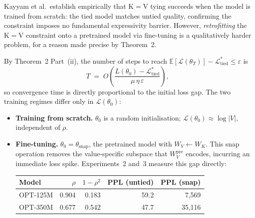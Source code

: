 

\begin{remark}
\label{rem:ft-vs-scratch}
Kayyam et al.\ establish empirically that K$=$V tying succeeds when
the model is trained from scratch: the tied model matches untied
quality, confirming the constraint imposes no fundamental
expressivity barrier.
However, \emph{retrofitting} the K$=$V constraint onto a pretrained
model via fine-tuning is a qualitatively harder problem, for a
reason made precise by Theorem~2.

By Theorem~2 Part~(ii), the number of steps to reach
$\mathbb{E}[\mathcal{L}(\theta_T)] - \mathcal{L}^*_{\mathrm{tied}} \leq \varepsilon$
is
\begin{equation}
  T \;=\; O\!\left(
    \frac{L(\theta_0) - \mathcal{L}^*_{\mathrm{tied}}}{\mu\,\eta\,\varepsilon}
  \right),
  \label{eq:T-bound}
\end{equation}
so convergence time is directly proportional to the initial loss gap.
The two training regimes differ only in $\mathcal{L}(\theta_0)$:

\begin{itemize}
  \item \textbf{Training from scratch.}
        $\theta_0$ is a random initialisation;
        $\mathcal{L}(\theta_0) \approx \log|V|$, independent of $\rho$.

  \item \textbf{Fine-tuning.}
        $\theta_0 = \theta_{\mathrm{snap}}$, the pretrained model with
        $W_V \leftarrow W_K$.  This snap operation removes the
        value-specific subspace that $W_V^{\mathrm{pre}}$ encodes,
        incurring an immediate loss spike.  Experiments~2 and~3 measure
        this gap directly:

        \begin{center}
        \begin{tabular}{lrrrr}
          \toprule
          Model & $\rho$ & $1-\rho^2$ &
            PPL (untied) & PPL (snap) \\
          \midrule
          OPT-125M & 0.904 & 0.183 & 59.2  & 7{,}569  \\
          OPT-350M & 0.677 & 0.542 & 47.7  & 35{,}116 \\
          \bottomrule
        \end{tabular}
        \end{center}


\end{itemize}
\end{remark}
